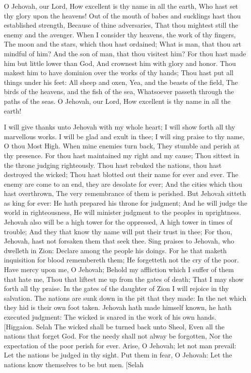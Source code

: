 O Jehovah, our Lord, How excellent is thy name in all the earth, Who hast set thy glory upon the heavens!  Out of the mouth of babes and sucklings hast thou established strength, Because of thine adversaries, That thou mightest still the enemy and the avenger.  When I consider thy heavens, the work of thy fingers, The moon and the stars, which thou hast ordained;  What is man, that thou art mindful of him? And the son of man, that thou visitest him?  For thou hast made him but little lower than God, And crownest him with glory and honor.  Thou makest him to have dominion over the works of thy hands; Thou hast put all things under his feet:  All sheep and oxen, Yea, and the beasts of the field,  The birds of the heavens, and the fish of the sea, Whatsoever passeth through the paths of the seas.  O Jehovah, our Lord, How excellent is thy name in all the earth! 

I will give thanks unto Jehovah with my whole heart; I will show forth all thy marvellous works.  I will be glad and exult in thee; I will sing praise to thy name, O thou Most High.  When mine enemies turn back, They stumble and perish at thy presence.  For thou hast maintained my right and my cause; Thou sittest in the throne judging righteously.  Thou hast rebuked the nations, thou hast destroyed the wicked; Thou hast blotted out their name for ever and ever.  The enemy are come to an end, they are desolate for ever; And the cities which thou hast overthrown, The very remembrance of them is perished.  But Jehovah sitteth as king for ever: He hath prepared his throne for judgment;  And he will judge the world in righteousness, He will minister judgment to the peoples in uprightness.  Jehovah also will be a high tower for the oppressed, A high tower in times of trouble;  And they that know thy name will put their trust in thee; For thou, Jehovah, hast not forsaken them that seek thee.  Sing praises to Jehovah, who dwelleth in Zion: Declare among the people his doings.  For he that maketh inquisition for blood remembereth them; He forgetteth not the cry of the poor.  Have mercy upon me, O Jehovah; Behold my affliction which I suffer of them that hate me, Thou that liftest me up from the gates of death;  That I may show forth all thy praise. In the gates of the daughter of Zion I will rejoice in thy salvation.  The nations are sunk down in the pit that they made: In the net which they hid is their own foot taken.  Jehovah hath made himself known, he hath executed judgment: The wicked is snared in the work of his own hands. [Higgaion. Selah  The wicked shall be turned back unto Sheol, Even all the nations that forget God.  For the needy shall not alway be forgotten, Nor the expectation of the poor perish for ever.  Arise, O Jehovah; let not man prevail: Let the nations be judged in thy sight.  Put them in fear, O Jehovah: Let the nations know themselves to be but men. [Selah 

